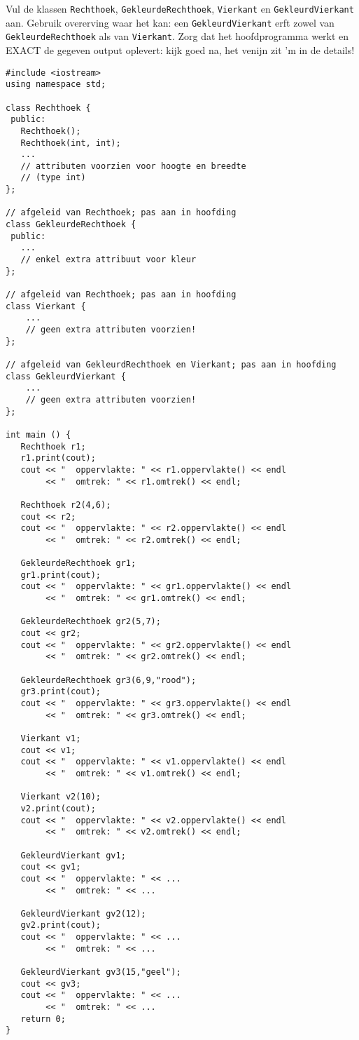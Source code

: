 \beginoef
Vul de klassen \verb}Rechthoek}, \verb}GekleurdeRechthoek}, \verb}Vierkant} en \verb}GekleurdVierkant} aan.
Gebruik overerving waar het kan: een \verb}GekleurdVierkant} erft zowel van \verb}GekleurdeRechthoek} als van \verb}Vierkant}.
Zorg dat het hoofdprogramma werkt en EXACT de gegeven output oplevert: kijk goed na, het venijn zit 'm in de details!
\begin{footnotesize}
\begin{verbatim}
#include <iostream>
using namespace std;

class Rechthoek {
 public:
   Rechthoek();
   Rechthoek(int, int);
   ...
   // attributen voorzien voor hoogte en breedte
   // (type int)
};

// afgeleid van Rechthoek; pas aan in hoofding
class GekleurdeRechthoek {
 public:
   ...
   // enkel extra attribuut voor kleur
};

// afgeleid van Rechthoek; pas aan in hoofding
class Vierkant {
    ...
    // geen extra attributen voorzien!
};

// afgeleid van GekleurdRechthoek en Vierkant; pas aan in hoofding
class GekleurdVierkant {
    ...
    // geen extra attributen voorzien!
};

int main () {
   Rechthoek r1;
   r1.print(cout);
   cout << "  oppervlakte: " << r1.oppervlakte() << endl
        << "  omtrek: " << r1.omtrek() << endl;
        
   Rechthoek r2(4,6);
   cout << r2;
   cout << "  oppervlakte: " << r2.oppervlakte() << endl
        << "  omtrek: " << r2.omtrek() << endl;
        
   GekleurdeRechthoek gr1;
   gr1.print(cout);
   cout << "  oppervlakte: " << gr1.oppervlakte() << endl
        << "  omtrek: " << gr1.omtrek() << endl;
        
   GekleurdeRechthoek gr2(5,7);
   cout << gr2;
   cout << "  oppervlakte: " << gr2.oppervlakte() << endl
        << "  omtrek: " << gr2.omtrek() << endl;
        
   GekleurdeRechthoek gr3(6,9,"rood");
   gr3.print(cout);
   cout << "  oppervlakte: " << gr3.oppervlakte() << endl
        << "  omtrek: " << gr3.omtrek() << endl; 
		
   Vierkant v1;
   cout << v1;
   cout << "  oppervlakte: " << v1.oppervlakte() << endl
        << "  omtrek: " << v1.omtrek() << endl;
        
   Vierkant v2(10);
   v2.print(cout);
   cout << "  oppervlakte: " << v2.oppervlakte() << endl
        << "  omtrek: " << v2.omtrek() << endl; 
		
   GekleurdVierkant gv1;
   cout << gv1;   
   cout << "  oppervlakte: " << ...
        << "  omtrek: " << ...
        
   GekleurdVierkant gv2(12);
   gv2.print(cout);
   cout << "  oppervlakte: " << ...
        << "  omtrek: " << ...
        
   GekleurdVierkant gv3(15,"geel");
   cout << gv3;
   cout << "  oppervlakte: " << ...
        << "  omtrek: " << ... 
   return 0;
}
\end{verbatim}
\end{footnotesize}
